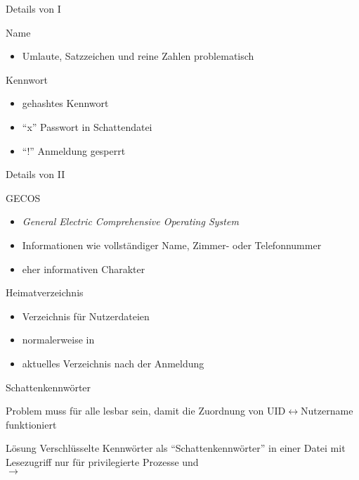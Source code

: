 \documentclass[aspectratio=43]{beamer}
\begin{document}
\begin{frame}{Details von  I}
  \begin{block}{Name}
    \begin{itemize}
      \item Umlaute, Satzzeichen und reine Zahlen problematisch
    \end{itemize}
  \end{block}
  \begin{block}{Kennwort}
    \begin{itemize}
      \item gehashtes Kennwort
      \item "`x"' Passwort in Schattendatei
      \item "`!"' Anmeldung gesperrt
    \end{itemize}
  \end{block}
\end{frame}

\begin{frame}{Details von  II}
  \begin{block}{GECOS}
    \begin{itemize}
      \item \emph{General Electric Comprehensive Operating System}
      \item Informationen wie vollständiger Name, Zimmer- oder Telefonnummer
      \item eher informativen Charakter
    \end{itemize}
  \end{block}
  \begin{block}{Heimatverzeichnis}
    \begin{itemize}
      \item Verzeichnis für Nutzerdateien
      \item normalerweise in 
      \item aktuelles Verzeichnis nach der Anmeldung
    \end{itemize}
  \end{block}
\end{frame}

\begin{frame}{Schattenkennwörter}
  \begin{alertblock}{Problem}
     muss für alle lesbar sein, 
    damit die Zuordnung von UID$\leftrightarrow$Nutzername funktioniert
  \end{alertblock}

  \begin{exampleblock}{Lösung}
      Verschlüsselte Kennwörter als "`Schattenkennwörter"' in einer Datei
        mit Lesezugriff nur für privilegierte Prozesse und \\
        $\rightarrow$ 
  \end{exampleblock}
\end{frame}
\end{document}
